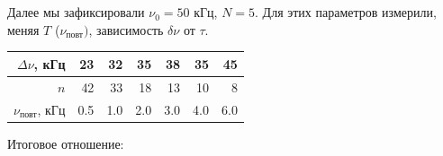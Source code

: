     \begin{figure}[H]
    \centering
    \\
\end{figure}
\begin{figure}[H]
    \centering
    \\
\end{figure}
\n
Далее мы зафиксировали $\nu_0 = 50$ кГц, $N = 5$. Для этих параметров измерили, меняя $T$ ($\nu_{\text{повт}})$, зависимость $\delta \nu$ от $\tau$.
\begin{table}[H]
\centering
\begin{tabular}{|r|r|r|r|r|r|r|}
\hline
$\Delta \nu$, кГц       & 23 & 32 & 35 & 38 & 35 & 45 \\ \hline
$n$                                                   & 42 & 33 & 18 & 13 & 10 &  8 \\ \hline
$\nu_{\text{повт}}$, кГц & 0.5 & 1.0  & 2.0  & 3.0  & 4.0 & 6.0  \\ \hline
\end{tabular}
\end{table}
Итоговое отношение:
